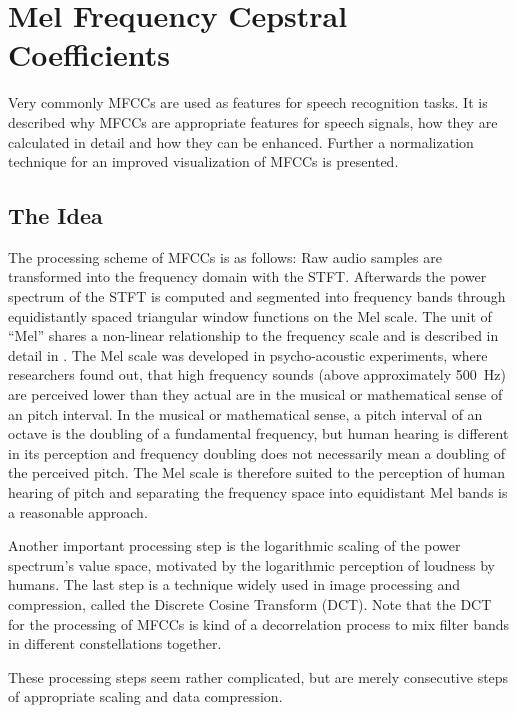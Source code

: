 
\section{Mel Frequency Cepstral Coefficients}\label{sec:signal_mfcc}
Very commonly MFCCs are used as features for speech recognition tasks.
It is described why MFCCs are appropriate features for speech signals, how they are calculated in detail and how they can be enhanced.
Further a normalization technique for an improved visualization of MFCCs is presented.



\subsection{The Idea}
The processing scheme of MFCCs \cite{Mermelstein1980} is as follows:
Raw audio samples are transformed into the frequency domain with the STFT.
Afterwards the power spectrum of the STFT is computed and segmented into frequency bands through equidistantly spaced triangular window functions on the Mel scale.
The unit of \enquote{Mel} shares a non-linear relationship to the frequency scale and is described in detail in .
The Mel scale was developed in psycho-acoustic experiments, where researchers found out, that high frequency sounds (above approximately \SI{500}{\hertz}) are perceived lower than they actual are in the musical or mathematical sense of an pitch interval.
In the musical or mathematical sense, a pitch interval of an octave is the doubling of a fundamental frequency, but human hearing is different in its perception and frequency doubling does not necessarily mean a doubling of the perceived pitch.
The Mel scale is therefore suited to the perception of human hearing of pitch and separating the frequency space into equidistant Mel bands is a reasonable approach.

Another important processing step is the logarithmic scaling of the power spectrum's value space, motivated by the logarithmic perception of loudness by humans.
The last step is a technique widely used in image processing and compression, called the Discrete Cosine Transform (DCT).
Note that the DCT for the processing of MFCCs is kind of a decorrelation process to mix filter bands in different constellations together.

These processing steps seem rather complicated, but are merely consecutive steps of appropriate scaling and data compression.



